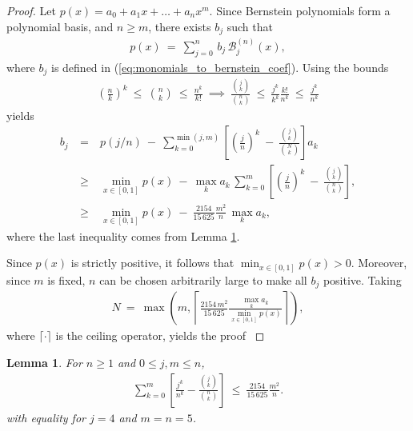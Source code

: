 \documentclass{article}
\newtheorem{lemma}{Lemma}
\begin{document}
\begin{proof}
{
    Let $p(x)=a_0+a_1x + \ldots + a_nx^m$. Since Bernstein polynomials form a polynomial basis, and $n\geq m$, there exists $b_j$ such that
    \begin{eqnarray}
        p(x) \ =\ \sum_{j=0}^n\, b_{j}\, \mathcal{B}_j^{(n)}(x), 
    \end{eqnarray}
    where $b_j$ is defined in (\ref{eq:monomials_to_bernstein_coef}). Using the bounds 
    \begin{eqnarray}
        \left(\frac{n}{k}\right)^k\ \leq\ \binom{n}{k}\ \leq\ \frac{n^k}{k!}\ \implies\ \frac{\binom{j}{k}}{\binom{n}{k}}\ \leq\ \frac{j^k}{k^k}\frac{k!}{n^k}\ \leq\ \frac{j^k}{n^k}
    \end{eqnarray}
    yields
    \begin{eqnarray}
    b_{j}\ &=&\ p(j/n)\ -\ \sum_{k=0}^{\min(j,m)}\left[ \left(\!\frac{j}{n}\!\right)^{\! k}\  -\ \frac{\binom{j}{k}}{\binom{N}{k}}\right] a_{k} \\ 
    &\ge&\ \min_{x\in[0,1]} p(x)\ -\ \max_{k} a_{k}\, \sum_{k=0}^{m}\left[ \left(\!\frac{j}{n}\!\right)^{\! k}\  -\  \frac{\binom{j}{k}}{\binom{n}{k}}\right],\\
    &\geq&\ \min_{x\in[0,1]}p(x)\ -\ \frac{2154}{15\,625} \frac{m^2}{n}\, \max_k a_k, 
    \end{eqnarray}
    where the last inequality comes from Lemma \ref{lemma:combination_bound}.
}

{
    Since $p(x)$ is strictly positive, it follows that $\min_{x\in[0,1]}p(x)>0$. Moreover, since $m$ is fixed, $n$ can be chosen arbitrarily large to make all $b_j$ positive. Taking
    \begin{eqnarray}\label{eq:positive_bernstein_bound}
        N\ =\ \max\left(m, \left \lceil\frac{2154\, m^2}{15\,625}\frac{\max_k a_k}{\min_{x\in[0,1]}p(x)}\right\rceil\right),
    \end{eqnarray}
    where $\lceil\cdot\rceil$ is the ceiling operator, yields the proof
}
\end{proof}


{
\begin{lemma}\label{lemma:combination_bound}
    For $n \ge 1$ and $0 \leq j, m \leq n$,
    \begin{align}
        \sum_{k=0}^{m} \left[ \frac{j^k}{n^k} - \frac{\binom{j}{k}}{\binom{n}{k}} \right] \ \leq\ \frac{2154}{15\,625}\frac{m^2}{n}.
    \end{align}
    with equality for $j=4$ and $m=n=5$.
\end{lemma}
}
\end{document}
